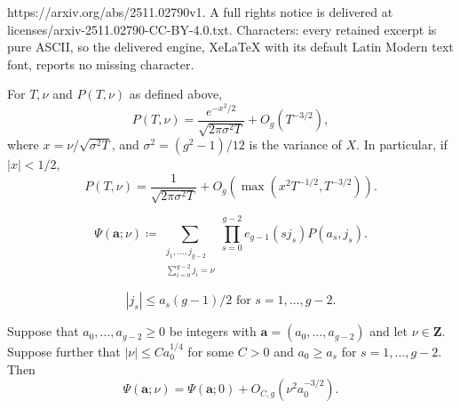 \documentclass[10pt,a4paper]{amsart}
\newcommand{\Z}{\ensuremath{\mathbf{Z}}}
\newcommand{\ru}[1]{e_{g-1}(#1)}
\renewcommand{\geq}{\geqslant}
\renewcommand{\leq}{\leqslant}
\begin{document}
https://arxiv.org/abs/2511.02790v1. A full rights notice is delivered at licenses/arxiv-2511.02790-CC-BY-4.0.txt. Characters: every retained excerpt is pure ASCII, so the delivered engine, XeLaTeX with its default Latin Modern text font, reports no missing character.
\begin{cor}\label{Local limit theorem application version}
    For $T,\nu$ and $P(T,\nu)$ as defined above,
    \[P(T,\nu)=\frac{e^{-x^{2}/2}}{\sqrt{2\pi\sigma^{2}T}}+O_{g}(T^{-3/2}),\]
    where $x=\nu/\sqrt{\sigma^{2}T}$, and $\sigma^{2}=(g^{2}-1)/12$ is the variance of $X$. In particular, if $|x|<1/2$,
    \[P(T,\nu)=\frac{1}{\sqrt{2\pi\sigma^{2}T}}+O_{g}(\max (x^{2}T^{-1/2},T^{-3/2})).\]
\end{cor}

\begin{equation}\label{psi defn}
    \Psi(\mathbf{a};\nu)\coloneq \sum_{\substack{j_{1},\ldots, j_{g-2}\\ \sum_{i=0}^{g-2} j_{i}=\nu}}\prod_{s=0}^{g-2}\ru{sj_{s}}P(a_{s},j_{s}).
\end{equation}

\begin{equation}\label{j range remark}
|j_{s}|\leq a_{s}(g-1)/2 \textrm{ for }s=1,\ldots, g-2.
\end{equation}

\begin{lemma}\label{psi lemma}
    Suppose that $a_{0},\ldots, a_{g-2}\geq 0$ be integers with $\mathbf{a}=(a_{0},\ldots, a_{g-2})$ and let $\nu\in \Z$. Suppose further that $|\nu|\leq Ca_{0}^{1/4}$ for some $C> 0$ and $a_{0}\geq a_{s}$ for $s=1,\ldots, g-2$. Then 
    \[\Psi(\mathbf{a};\nu)=\Psi(\mathbf{a};0)+O_{C,g}(\nu^{2}a_{0}^{-3/2}).\]
\end{lemma}
\end{document}
